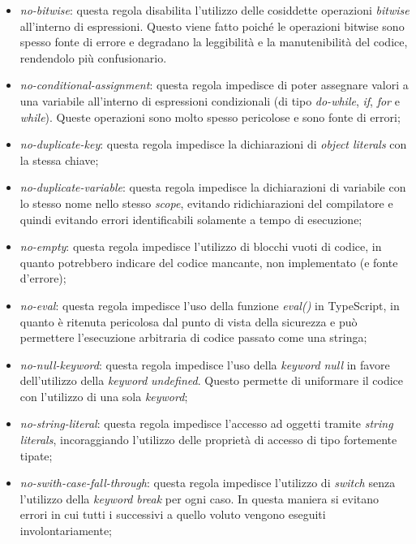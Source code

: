 \begin{itemize}
                \item \textit{no-bitwise}: questa regola disabilita l'utilizzo delle cosiddette operazioni \textit{bitwise} all'interno di espressioni. Questo viene fatto poiché le operazioni bitwise sono spesso fonte di errore e degradano la leggibilit\`a e la manutenibilità del codice, rendendolo pi\`u confusionario.
                \item \textit{no-conditional-assignment}: questa regola impedisce di poter assegnare valori a una variabile all'interno di espressioni condizionali (di tipo \textit{do-while}, \textit{if}, \textit{for} e \textit{while}). Queste operazioni sono molto spesso pericolose e sono fonte di errori;
                \item \textit{no-duplicate-key}: questa regola impedisce la dichiarazioni di \textit{object literals} con la stessa chiave;
                \item \textit{no-duplicate-variable}: questa regola impedisce la dichiarazioni di variabile con lo stesso nome nello stesso \textit{scope}, evitando ridichiarazioni del compilatore e quindi evitando errori identificabili solamente a tempo di esecuzione;
                \item \textit{no-empty}: questa regola impedisce l'utilizzo di blocchi vuoti di codice, in quanto potrebbero indicare del codice mancante, non implementato (e fonte d'errore);
                \item \textit{no-eval}: questa regola impedisce l'uso della funzione \textit{eval()} in TypeScript, in quanto \`e ritenuta pericolosa dal punto di vista della sicurezza e pu\`o permettere l'esecuzione arbitraria di codice passato come una stringa;
                \item \textit{no-null-keyword}: questa regola impedisce l'uso della \textit{keyword} \textit{null} in favore dell'utilizzo della \textit{keyword} \textit{undefined}. Questo permette di uniformare il codice con l'utilizzo di una sola \textit{keyword};
                \item \textit{no-string-literal}: questa regola impedisce l'accesso ad oggetti tramite \textit{string literals}, incoraggiando l'utilizzo delle propriet\`a di accesso di tipo fortemente tipate;
                \item \textit{no-swith-case-fall-through}: questa regola impedisce l'utilizzo di \textit{switch} senza l'utilizzo della \textit{keyword} \textit{break} per ogni caso. In questa maniera si evitano errori in cui tutti i  successivi a quello voluto vengono eseguiti involontariamente;

\end{itemize}
